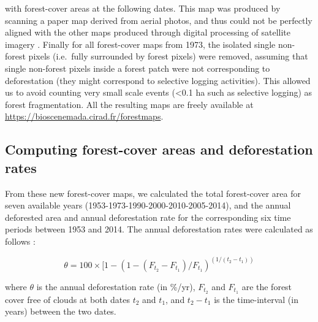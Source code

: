 \documentclass[a4paper, 12pt, leqno]{article} %
\begin{document}
with forest-cover areas at the following dates. This map was produced
by scanning a paper map derived from aerial photos, and thus could not
be perfectly aligned with the other maps produced through digital
processing of satellite imagery \citep{Harper2007}. Finally for all
forest-cover maps from 1973, the isolated single non-forest pixels
(i.e.~fully surrounded by forest pixels) were removed, assuming that
single non-forest pixels inside a forest patch were not corresponding
to deforestation (they might correspond to selective logging
activities). This allowed us to avoid counting very small scale events
(\textless{}0.1 ha such as selective logging) as forest
fragmentation. All the resulting maps are freely available at
\url{https://bioscenemada.cirad.fr/forestmaps}.

\subsection{Computing forest-cover areas and deforestation
rates}

From these new forest-cover maps, we calculated the total forest-cover
area for seven available years (1953-1973-1990-2000-2010-2005-2014),
and the annual deforested area and annual deforestation rate for the
corresponding six time periods between 1953 and 2014. The annual
deforestation rates were calculated as follows \citep{Puyravaud2003,
  Vieilledent2013}:

\begin{equation*}
  \theta = 100 \times [1-(1-(F_{t_2}-F_{t_1})/F_{t_1})^{(1/(t_2-t_1))}
\end{equation*}

where $\theta$ is the annual deforestation rate (in \%/yr),
$F_{t_2}$ and $F_{t_1}$ are the forest cover free of clouds at both
dates $t_2$ and $t_1$, and $t_2-t_1$ is the time-interval (in
years) between the two dates.
\end{document}
